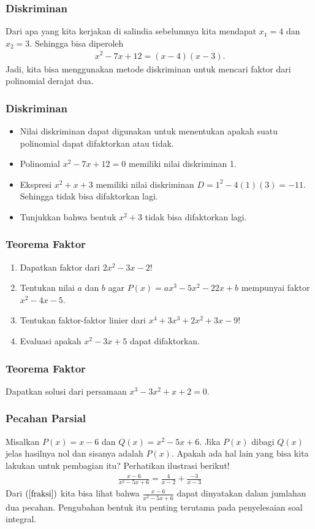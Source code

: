 \documentclass[11pt]{beamer}
\begin{document}
	\begin{frame}
		\frametitle{Diskriminan}
		Dari apa yang kita kerjakan di salindia sebelumnya kita mendapat $x_1=4$ dan $x_2=3$. Sehingga bisa diperoleh
			\begin{align*}
				x^2-7x+12=(x-4)(x-3).
			\end{align*}	
		Jadi, kita bisa menggunakan metode diskriminan untuk mencari faktor dari polinomial derajat dua.
	\end{frame}
	
	\begin{frame}
		\frametitle{Diskriminan}
		\begin{itemize}
			\item Nilai diskriminan dapat digunakan untuk menentukan apakah suatu polinomial dapat difaktorkan atau tidak.
			\item Polinomial $x^2-7x+12=0$ memiliki nilai diskriminan 1.
			\item Ekspresi $x^2+x+3$ memiliki nilai diskriminan $D=1^2-4(1)(3)=-11.$ Sehingga tidak bisa difaktorkan lagi.
			\item Tunjukkan bahwa bentuk $x^2+3$ tidak bisa difaktorkan lagi.
			
		\end{itemize}
		 
	\end{frame}
	
	\begin{frame}
		\frametitle{Teorema Faktor}
		\begin{enumerate}
			\item Dapatkan faktor dari $2x^2-3x-2$!
			\item Tentukan nilai $a$ dan $b$ agar $P(x)=ax^3-5x^2-22x+b$ mempunyai faktor $x^2-4x-5$. 
			\item Tentukan faktor-faktor linier dari $x^4+3x^3+2x^2+3x-9$!
			\item Evaluasi apakah $x^2-3x+5$ dapat difaktorkan.
		\end{enumerate}
	\end{frame}
	
	\begin{frame}
		\frametitle{Teorema Faktor}
		Dapatkan solusi dari persamaan $x^3-3x^2+x+2=0$.
	\end{frame}
	
	\begin{frame}
		\frametitle{Pecahan Parsial}
		Misalkan $P(x)=x-6$ dan $Q(x)=x^2-5x+6$. Jika $P(x)$ dibagi $Q(x)$ jelas hasilnya nol dan sisanya adalah $P(x)$. Apakah ada hal lain yang bisa kita lakukan untuk pembagian itu? Perhatikan ilustrasi berikut!
		\begin{align}
			\frac{x-6}{x^2-5x+6}=\frac{4}{x-2}+\frac{-3}{x-3}\label{fraksi}
		\end{align}
		Dari $(\ref{fraksi})$ kita bisa lihat bahwa $\frac{x-6}{x^2-5x+6}$ dapat dinyatakan dalam jumlahan dua pecahan. Pengubahan bentuk itu penting terutama pada penyelesaian soal integral.
	\end{frame}
	
\end{document}
